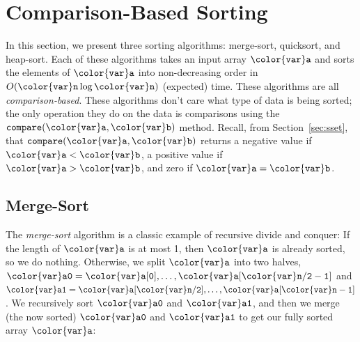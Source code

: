 \documentclass[10pt]{book}
\newcommand{\seclabel}[1]{\label{sec:#1}}
\newcommand{\secref}[1]{Section~\ref{sec:#1}}
\theoremstyle{plain}
\theoremstyle{definition}
\begin{document}
\section{Comparison-Based Sorting}

%
%
In this section, we present three sorting algorithms: merge-sort,
quicksort, and heap-sort.  Each of these algorithms takes an input array \ensuremath{\mathtt{{\color{var}a}}}
and sorts the elements of \ensuremath{\mathtt{{\color{var}a}}} into non-decreasing order in $O(\ensuremath{\mathtt{{\color{var}n}}}\log \ensuremath{\mathtt{{\color{var}n}}})$
(expected) time.  These algorithms are all \emph{comparison-based}.
  These algorithms don't care what type
of data is being sorted; the only operation they do on the data is
comparisons using the \ensuremath{\mathtt{compare({\color{var}a},{\color{var}b})}} method. Recall, from \secref{sset},
that \ensuremath{\mathtt{compare({\color{var}a},{\color{var}b})}} returns a negative value if $\ensuremath{\mathtt{{\color{var}a}}}<\ensuremath{\mathtt{{\color{var}b}}}$, a positive
value if $\ensuremath{\mathtt{{\color{var}a}}}>\ensuremath{\mathtt{{\color{var}b}}}$, and zero if $\ensuremath{\mathtt{{\color{var}a}}}=\ensuremath{\mathtt{{\color{var}b}}}$.

\subsection{Merge-Sort}
\seclabel{merge-sort}

%
The \emph{merge-sort} algorithm is a classic example of recursive divide
and conquer: 
%
If the length of \ensuremath{\mathtt{{\color{var}a}}} is at most 1, then \ensuremath{\mathtt{{\color{var}a}}} is already
sorted, so we do nothing.  Otherwise, we split \ensuremath{\mathtt{{\color{var}a}}} into two halves,
$\ensuremath{\mathtt{{\color{var}a0}}}=\ensuremath{\mathtt{{\color{var}a}[0]}},\ldots,\ensuremath{\mathtt{{\color{var}a}[{\color{var}n}/2-1]}}$ and $\ensuremath{\mathtt{{\color{var}a1}}}=\ensuremath{\mathtt{{\color{var}a}[{\color{var}n}/2]}},\ldots,\ensuremath{\mathtt{{\color{var}a}[{\color{var}n}-1]}}$.
We recursively sort \ensuremath{\mathtt{{\color{var}a0}}} and \ensuremath{\mathtt{{\color{var}a1}}}, and then we merge (the now sorted)
\ensuremath{\mathtt{{\color{var}a0}}} and \ensuremath{\mathtt{{\color{var}a1}}} to get our fully sorted array \ensuremath{\mathtt{{\color{var}a}}}:
\end{document}
